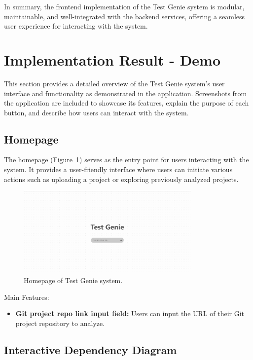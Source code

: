 In summary, the frontend implementation of the Test Genie system is modular, maintainable, and well-integrated with the backend services, offering a seamless user experience for interacting with the system.

\section{Implementation Result - Demo}

This section provides a detailed overview of the Test Genie system's user interface and functionality as demonstrated in the application. Screenshots from the application are included to showcase its features, explain the purpose of each button, and describe how users can interact with the system.

\subsection{Homepage}

The homepage (Figure~\ref{fig:homepage}) serves as the entry point for users interacting with the system. It provides a user-friendly interface where users can initiate various actions such as uploading a project or exploring previously analyzed projects.

\begin{figure}[H]
    \centering
    \includegraphics[width=0.8\textwidth]{images/homepage.png}
    \caption{Homepage of Test Genie system.}
    \label{fig:homepage}
\end{figure}

Main Features:
\begin{itemize}
    \item \textbf{Git project repo link input field:} Users can input the URL of their Git project repository to analyze.
\end{itemize}
\subsection{Interactive Dependency Diagram}


